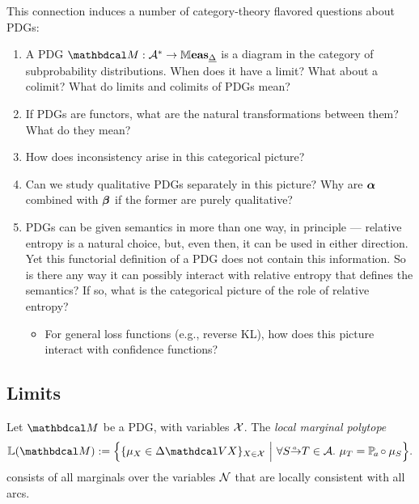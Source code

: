 This connection induces a number of category-theory flavored questions about PDGs:
\begin{enumerate}
    \item A PDG $\dg M : \mathcal A^* \to \Meas_{\underline\Delta}$ is a diagram in the category of subprobability distributions. When does it have a limit? What about a colimit? What do limits and colimits of PDGs mean? 

    \item If PDGs are functors, what are the natural transformations between them? What do they mean? 
    \item How does inconsistency arise in this categorical picture? 
    \item Can we study qualitative PDGs separately in this picture? Why are $\boldsymbol\alpha$ combined with $\boldsymbol\beta$ if the former are purely qualitative? 
    
    
    \item 
    PDGs can be given semantics in more than one way, in principle --- relative entropy is a natural choice, but, even then, it can be used in either direction.  Yet this functorial definition of a PDG does not contain this information.
    So is there any way it can possibly interact with relative entropy that defines the semantics? 
    If so, what is the categorical picture of the role of relative entropy?
    \begin{itemize}
        \item For general loss functions (e.g., reverse KL),
         how does this picture interact with confidence functions?  
    \end{itemize}
\end{enumerate}



\subsection{Limits}

\begin{defn}
    Let $\dg M$ be a PDG, with variables $\mathcal X$. 
    The \emph{local marginal polytope}
    \begin{equation}
        \mathbb L(\dg M) := 
            \Big\{ 
                \{ \mu_X \in \Delta \V X  
                \}_{X \in \X}
            ~\Big|~
                \forall \ed aST \in \Ar.~ \mu_T = \p_a \circ \mu_S 
            \Big\}.
    \end{equation}
    consists of all marginals over the variables $\mathcal N$ that are locally consistent with all arcs. 
\end{defn}

